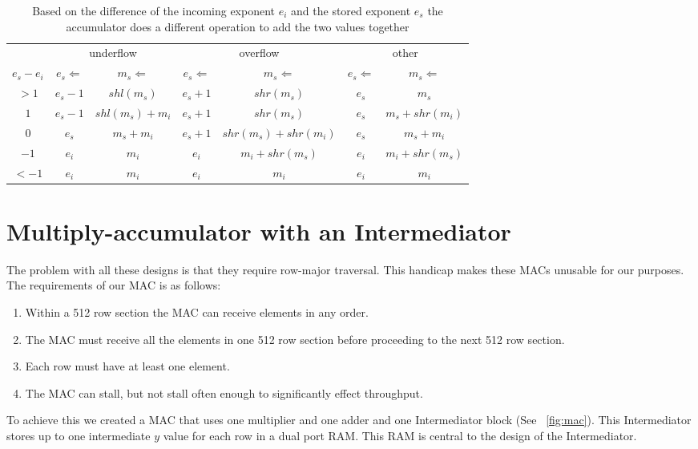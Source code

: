 \begin{table}
    \caption[How the stored value is updated in an in-order accumulator based on the stored value and incomming value.]{Based on the difference of the incoming exponent $e_i$ and the stored exponent $e_s$ the accumulator does a different operation to add the two values together}
    \label{tbl:accumulator_ops}
    \begin{tabular}{c|cc|cc|cc}
        & \multicolumn{2}{c|}{underflow} & \multicolumn{2}{c|}{overflow} & \multicolumn{2}{c}{other} \\
        $e_s - e_i$ & $e_s\Leftarrow$ & $m_s\Leftarrow$ & $e_s\Leftarrow$ & $m_s\Leftarrow$ & $e_s\Leftarrow$ & $m_s\Leftarrow$ \\
        \hline
        $>1$ & $e_s - 1$ & $shl(m_s)$ & $e_s + 1$ & $shr(m_s)$ & $e_s$ & $m_s$ \\
        $1$ & $e_s - 1$ & $shl(m_s) + m_i$ & $e_s + 1$ & $shr(m_s)$ & $e_s$ & $m_s + shr(m_i)$ \\
        $0$ & $e_s$ & $m_s + m_i$ & $e_s + 1$ & $shr(m_s) + shr(m_i)$ & $e_s$ & $m_s + m_i$ \\
        $-1$ & $e_i$ & $m_i$ & $e_i$ & $m_i + shr(m_s)$ & $e_i$ & $m_i + shr(m_s)$\\
        $<-1$ & $e_i$ & $m_i$ & $e_i$ & $m_i$ & $e_i$ & $m_i$ \\
    \end{tabular}
\end{table}

\section{Multiply-accumulator with an Intermediator}
\label{sec:intermediator}
The problem with all these designs is that they require row-major traversal. This handicap makes these MACs unusable for our purposes. The requirements of our MAC is as follows:
\begin{enumerate}
    \item Within a 512 row section the MAC can receive elements in any order.
    \item The MAC must receive all the elements in one 512 row section before proceeding to the next 512 row section.
    \item Each row must have at least one element.
    \item The MAC can stall, but not stall often enough to significantly effect throughput.

\end{enumerate}
To achieve this we created a MAC that uses one multiplier and one adder and one Intermediator block (See \figurename~\ref{fig:mac}). This Intermediator stores up to one intermediate $y$ value for each row in a dual port RAM. This RAM is central to the design of the Intermediator.

